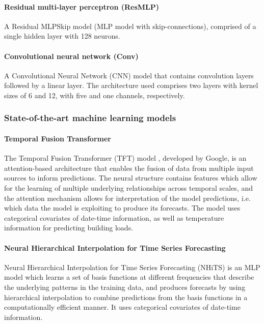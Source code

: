\paragraph{Residual multi-layer perceptron (ResMLP)}

A Residual MLPSkip model (MLP model with skip-connections), comprised of a single hidden layer with 128 neurons.

\paragraph{Convolutional neural network (Conv)}

A Convolutional Neural Network (CNN) model that contains convolution layers followed by a linear layer. The architecture used comprises two layers with kernel sizes of 6 and 12, with five and one channels, respectively.

\subsubsection{State-of-the-art machine learning models}

\paragraph{Temporal Fusion Transformer}

The Temporal Fusion Transformer (TFT) model \citep{lim2021TemporalFusionTransformers}, developed by Google, is an attention-based architecture that enables the fusion of data from multiple input sources to inform predictions. The neural structure contains features which allow for the learning of multiple underlying relationships across temporal scales, and the attention mechanism allows for interpretation of the model predictions, i.e. which data the model is exploiting to produce its forecasts. The model uses categorical covariates of date-time information, as well as temperature information for predicting building loads.

\paragraph{Neural Hierarchical Interpolation for Time Series Forecasting}

Neural Hierarchical Interpolation for Time Series Forecasting (NHiTS) \citep{challu2023NHITSNeuralHierarchical} is an MLP model which learns a set of basis functions at different frequencies that describe the underlying patterns in the training data, and produces forecasts by using hierarchical interpolation to combine predictions from the basis functions in a computationally efficient manner. It uses categorical covariates of date-time information.

